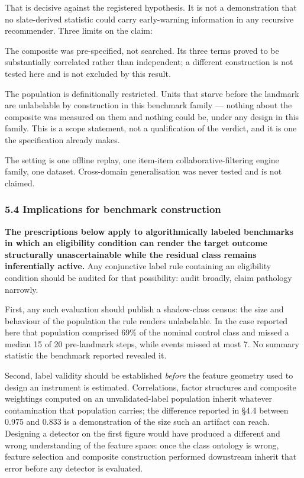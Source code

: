 \documentclass[
  11pt,
]{article}
\begin{document}
That is decisive against the registered hypothesis. It is not a
demonstration that no slate-derived statistic could carry early-warning
information in any recursive recommender. Three limits on the claim:

The composite was pre-specified, not searched. Its three terms proved to
be substantially correlated rather than independent; a different
construction is not tested here and is not excluded by this result.

The population is definitionally restricted. Units that starve before
the landmark are unlabelable by construction in this benchmark family
--- nothing about the composite was measured on them and nothing could
be, under any design in this family. This is a scope statement, not a
qualification of the verdict, and it is one the specification already
makes.

The setting is one offline replay, one item-item collaborative-filtering
engine family, one dataset. Cross-domain generalisation was never tested
and is not claimed.

\subsubsection{5.4 Implications for benchmark
construction}\label{implications-for-benchmark-construction}

\textbf{The prescriptions below apply to algorithmically labeled
benchmarks in which an eligibility condition can render the target
outcome structurally unascertainable while the residual class remains
inferentially active.} Any conjunctive label rule containing an
eligibility condition should be audited for that possibility: audit
broadly, claim pathology narrowly.

First, any such evaluation should publish a shadow-class census: the
size and behaviour of the population the rule renders unlabelable. In
the case reported here that population comprised 69\% of the nominal
control class and missed a median 15 of 20 pre-landmark steps, while
events missed at most 7. No summary statistic the benchmark reported
revealed it.

Second, label validity should be established \emph{before} the feature
geometry used to design an instrument is estimated. Correlations, factor
structures and composite weightings computed on an unvalidated-label
population inherit whatever contamination that population carries; the
difference reported in §4.4 between 0.975 and 0.833 is a demonstration
of the size such an artifact can reach. Designing a detector on the
first figure would have produced a different and wrong understanding of
the feature space: once the class ontology is wrong, feature selection
and composite construction performed downstream inherit that error
before any detector is evaluated.
\end{document}

